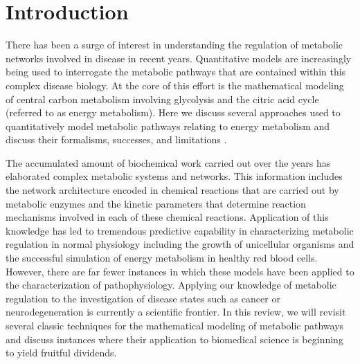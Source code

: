 \documentclass[phd,tocprelim]{cornell}
\begin{document}
\contentspage
\tablelistpage
\figurelistpage

\normalspacing \setcounter{page}{1} 
\pagestyle{cornell} \addtolength{\parskip}{0.5\baselineskip}

\chapter{Introduction}

There has been a surge of interest in understanding the regulation of
metabolic networks involved in disease in recent years.  Quantitative
models are increasingly being used to interrogate the metabolic
pathways that are contained within this complex disease biology.  At
the core of this effort is the mathematical modeling of central carbon
metabolism involving glycolysis and the citric acid cycle (referred to
as energy metabolism).  Here we discuss several approaches used to
quantitatively model metabolic pathways relating to energy metabolism
and discuss their formalisms, successes, and limitations \introSameGeneCredit.

The accumulated amount of biochemical work carried out over the years
has elaborated complex metabolic systems and networks.  This
information includes the network architecture encoded in chemical
reactions that are carried out by metabolic enzymes and the kinetic
parameters that determine reaction mechanisms involved in each of
these chemical reactions.  Application of this knowledge has led to
tremendous predictive capability in characterizing metabolic
regulation in normal physiology including the growth of unicellular
organisms and the successful simulation of energy metabolism in
healthy red blood cells.  However, there are far fewer instances in
which these models have been applied to the characterization of
pathophysiology.  Applying our knowledge of metabolic regulation to
the investigation of disease states such as cancer or
neurodegeneration is currently a scientific frontier.  In this review,
we will revisit several classic techniques for the mathematical
modeling of metabolic pathways and discuss instances where their
application to biomedical science is beginning to yield fruitful
dividends.
\end{document}
